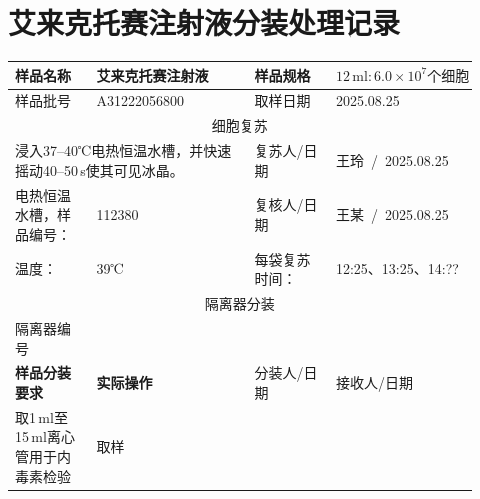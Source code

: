 \documentclass[UTF8,10pt,a4paper,fontset=fandol]{ctexart}
\newcommand{\fieldvalue}[1]{#1}
\newcommand{\handwritten}[1]{#1}
\begin{document}
\section*{艾来克托赛注射液分装处理记录}

\begin{tabular}{|p{0.16\linewidth}|p{0.31\linewidth}|p{0.16\linewidth}|p{0.29\linewidth}|}
\hline
样品名称 &
\fieldvalue{艾来克托赛注射液} &
样品规格 &
\fieldvalue{$12\,\mathrm{ml}: 6.0\times 10^{7}\text{个细胞}$} \\
\hline
样品批号 &
\fieldvalue{\handwritten{A31222056800}} &
取样日期 &
\fieldvalue{\handwritten{2025.08.25}} \\
\hline
\multicolumn{4}{|c|}{细胞复苏} \\
\hline
\multicolumn{2}{|p{0.47\linewidth}|}{
浸入37--40℃电热恒温水槽，并快速摇动40--50\,s使其可见冰晶。}
&
复苏人/日期 &
\fieldvalue{\handwritten{王玲\ /\ 2025.08.25}} \\
\hline
电热恒温水槽，样品编号： &
\fieldvalue{\handwritten{112380}} &
复核人/日期 &
\fieldvalue{\handwritten{王某\ /\ 2025.08.25}} \\
\hline
温度： &
\fieldvalue{\handwritten{39℃}} &
每袋复苏时间： &
\fieldvalue{\handwritten{12:25、13:25、14:??}} \\
\hline
\multicolumn{4}{|c|}{隔离器分装} \\
\hline
隔离器编号 &
\fieldvalue{} &
\multicolumn{2}{l|}{} \\
\hline
\textbf{样品分装要求} &
\textbf{实际操作} &
分装人/日期 &
接收人/日期 \\
\hline
取1\,ml至15\,ml离心管用于内毒素检验 &
取样\ 

\end{tabular}
\end{document}
